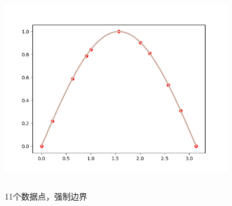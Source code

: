 \documentclass[UTF8]{ctexart}
\begin{document}
\begin{figure}[H]
 \centering
  \includegraphics[width=10cm,height=9cm]{4-3_11.png}
  \caption{11个数据点，强制边界}
\end{figure}
\end{document}
